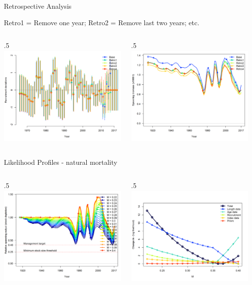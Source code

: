 \documentclass[ignorenonframetext,]{beamer}
\def\begincols{\begin{columns}}
\def\begincol{\begin{column}}
\def\endcol{\end{column}}
\def\endcols{\end{columns}}
\begin{document}
\begin{frame}{Retrospective Analysis}

Retro1 = Remove one year; Retro2 = Remove last two years; etc.
\begincols
 \begincol{.5\textwidth}
\includegraphics[height=5cm]{Figures/retro_recdev.png} \endcol
 \begincol{.5\textwidth}
\includegraphics[height=5cm]{Figures/retro_spawnb.png} \endcol
\endcols

\end{frame}

\begin{frame}{Likelihood Profiles - natural mortality}

\begincols
 \begincol{.5\textwidth}
\includegraphics[height=5cm]{Figures/profile_m_depl.png} \endcol
 \begincol{.5\textwidth}
\includegraphics[height=5cm]{Figures/profile_m_like.png}\\
\endcol
\endcols

\end{frame}
\end{document}
